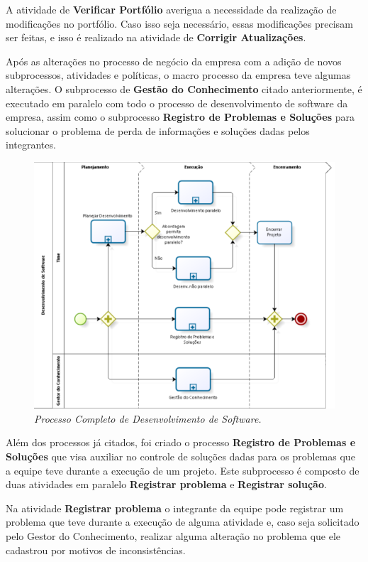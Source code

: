 A atividade de \textbf{Verificar Portfólio} averigua a necessidade da realização de modificações no portfólio. Caso isso seja necessário, essas modificações precisam ser feitas, e isso é realizado na atividade de \textbf{Corrigir Atualizações}.

Após as alterações no processo de negócio da empresa com a adição de novos subprocessos, atividades e políticas, o macro processo da empresa teve algumas alterações. O subprocesso de \textbf{Gestão do Conhecimento} citado anteriormente, é executado em paralelo com todo o processo de desenvolvimento de software da empresa, assim como o subprocesso \textbf{Registro de Problemas e Soluções} para solucionar o problema de perda de informações e soluções dadas pelos integrantes. 

\begin{figure}[H]
\centering\includegraphics[scale=0.5]{figuras/imagemAleatoria.png}
\caption{\textit{Processo Completo de Desenvolvimento de Software.}}
\end{figure}

Além dos processos já citados, foi criado o processo \textbf{Registro de Problemas e Soluções} que visa auxiliar no controle de soluções dadas para os problemas que a equipe teve durante a execução de um projeto. Este subprocesso é composto de duas atividades em paralelo \textbf{Registrar problema} e \textbf{Registrar solução}. 

Na atividade \textbf{Registrar problema} o integrante da equipe pode registrar um problema que teve durante a execução de alguma atividade e, caso seja solicitado pelo Gestor do Conhecimento, realizar alguma alteração no problema que ele cadastrou por motivos de inconsistências.

